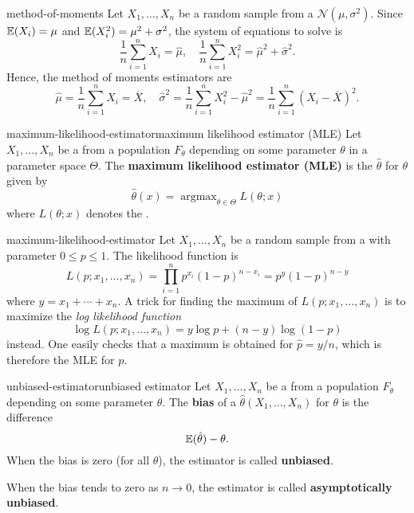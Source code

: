 \begin{example}{method-of-moments}
    Let $X_1, \ldots, X_n$ be a random sample from a  $\mathcal{N}(\mu, \sigma^2)$. Since $\mathbb{E}(X_i) = \mu$ and $\mathbb{E}(X_i^2) = \mu^2 + \sigma^2$, the system of equations to solve is
    \[ \frac{1}{n} \sum_{i = 1}^{n} X_i = \hat{\mu}, \quad \frac{1}{n} \sum_{i = 1}^{n} X_i^2 = \hat{\mu}^2 + \hat{\sigma}^2 . \]
    Hence, the method of moments estimators are
    \[ \hat{\mu} = \frac{1}{n} \sum_{i = 1}^{n} X_i = \overline{X}, \quad \hat{\sigma}^2 = \frac{1}{n} \sum_{i = 1}^{n} X_i^2 - \hat{\mu}^2 = \frac{1}{n} \sum_{i = 1}^{n} (X_i - \overline{X})^2 . \]
\end{example}

\begin{topic}{maximum-likelihood-estimator}{maximum likelihood estimator (MLE)}
    Let $X_1, \ldots, X_n$ be a  from a population $F_\theta$ depending on some parameter $\theta$ in a parameter space $\Theta$. The \textbf{maximum likelihood estimator (MLE)} is the  $\hat{\theta}$ for $\theta$ given by
    \[ \hat{\theta}(x) = \operatorname{argmax}_{\theta \in \Theta} L(\theta; x) \]
    where $L(\theta; x)$ denotes the .
\end{topic}

\begin{example}{maximum-likelihood-estimator}
    Let $X_1, \ldots, X_n$ be a random sample from a  with parameter $0 \le p \le 1$. The likelihood function is
    \[ L(p; x_1, \ldots, x_n) = \prod_{i = 1}^{n} p^{x_i} (1 - p)^{n - x_i} = p^y (1 - p)^{n - y} \]
    where $y = x_1 + \cdots + x_n$. A trick for finding the maximum of $L(p; x_1, \ldots, x_n)$ is to maximize the \textit{log likelihood function}
    \[ \log L(p; x_1, \ldots, x_n) = y \log p + (n - y) \log (1 - p) \]
    instead. One easily checks that a maximum is obtained for $\hat{p} = y / n$, which is therefore the MLE for $p$.
\end{example}

\begin{topic}{unbiased-estimator}{unbiased estimator}
    Let $X_1, \ldots, X_n$ be a  from a population $F_\theta$ depending on some parameter $\theta$. The \textbf{bias} of a  $\hat{\theta}(X_1, \ldots, X_n)$ for $\theta$ is the difference
    \[ \mathbb{E}(\hat{\theta}) - \theta . \]
    When the bias is zero (for all $\theta$), the estimator is called \textbf{unbiased}.

    When the bias tends to zero as $n \to 0$, the estimator is called \textbf{asymptotically unbiased}.
\end{topic}

